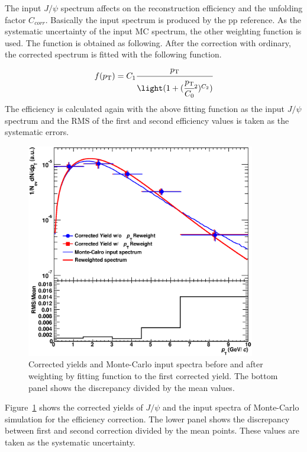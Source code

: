 The input $J/\psi$ spectrum affects on the reconstruction efficiency and the unfolding factor $C_{corr}$.
Basically the input spectrum is produced by the pp reference. 
As the systematic uncertainty of the input MC spectrum, the other weighting function is used. 
The function is obtained as following. 
After the correction with ordinary, the corrected spectrum is fitted with the following function. 
\begin{equation}
  f(p_{\rm{T}}) = C_{1}\cfrac{p_{\rm{T}}}{\light( 1+ (\cfrac{p_{\rm{T}}}{C_{0}}^{2})^{C_{2}})}
\end{equation}
The efficiency is calculated again with the above fitting function as the input $J/\psi$ spectrum and the RMS of the first and second efficiency values is taken as the systematic errors. 
\begin{figure}[!h]
  \centering
  \includegraphics[width=10cm]{chap4/figure/Correction/JpsiCorrYield_MCWeightDep_LHC13d10.eps}
  \caption{Corrected yields and Monte-Carlo input spectra before and after weighting by fitting function to the first corrected yield. The bottom panel shows the  discrepancy divided by the  mean values. }
  \label{fig_4_jpsieff_mcweight}
\end{figure}
Figure~\ref{fig_4_jpsieff_mcweight} shows the corrected yields of $J/\psi$ and the input spectra of Monte-Carlo simulation for the efficiency correction. 
The lower panel shows the discrepancy between first and second correction divided by the mean points. 
These values are taken as the systematic uncertainty.  


